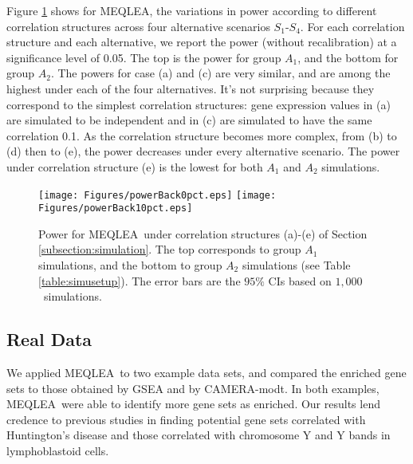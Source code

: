 \documentclass[useAMS,usenatbib, galley]{biom}
\newcommand{\OurMethod}{MEQLEA}
\newcommand{\aaCase}{a}
\newcommand{\aCase}{b}
\newcommand{\cCase}{c}
\newcommand{\eCase}{d}
\newcommand{\fCase}{e}
\newcommand{\CMT}{CAMERA-modt}
\newcommand{\HowmanySimu}{$1,000$}
\begin{document}
	Figure \ref{fig:power} shows for \OurMethod, the variations in power according to different correlation structures across four alternative scenarios $S_1$-$S_4$. For each correlation structure and each alternative, we report the power (without recalibration) at a significance level of 0.05. The top is the power for group $A_1$, and the bottom for group $A_2$.  The powers for case (\aaCase) and (\cCase) are very similar, and are among the highest under each of the four alternatives. It's not surprising because they correspond to the simplest correlation structures: gene expression values in (\aaCase) are simulated to be independent and in (\cCase) are simulated to have the same correlation 0.1. As the correlation structure becomes more complex, from (\aCase) to (\eCase) then to (\fCase), the power decreases under every alternative scenario. The power under correlation structure (\fCase) is the lowest for both $A_1$ and $A_2$ simulations.%
	
\begin{figure}
	\begin{center}
		\texttt{[image: Figures/powerBack0pct.eps]}
		\texttt{[image: Figures/powerBack10pct.eps]}
	\end{center} 
		\caption{Power for \OurMethod~under correlation structures (\aaCase)-(\fCase) of Section \ref{subsection:simulation}. The top corresponds to group $A_1$ simulations, and the bottom to group $A_2$ simulations (see Table \ref{table:simusetup}). The error bars are the $95\%$ CIs based on \HowmanySimu~simulations. }\label{fig:power}
\end{figure} 
	
	\subsection{Real Data}\label{section:realdata}
	We applied \OurMethod~to two example data sets, and compared the enriched gene sets to those obtained by GSEA and by \CMT. In both examples, \OurMethod~were able to identify more gene sets as enriched. Our results lend credence to previous studies in finding potential gene sets correlated with Huntington's disease and those correlated with chromosome Y and Y bands in lymphoblastoid cells.  
	
\end{document}
